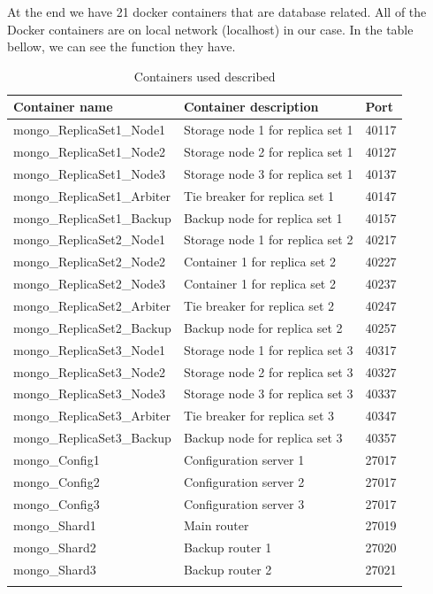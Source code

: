 At the end we have 21 docker containers that are database related. All of the Docker containers are on local network (localhost) in our case. In the table bellow, we can see the function they have.

\begin{center}
\begin{longtable}{ |m{5.5cm}|m{6cm}|m{1.5cm}| } 
 \hline
    Container name & Container description & Port \\ 
 \hline
 \hline
    mongo{\_}ReplicaSet1{\_}Node1 & Storage node 1 for replica set 1 & 40117\\ 
 \hline
    mongo{\_}ReplicaSet1{\_}Node2 & Storage node 2 for replica set 1 & 40127\\ 
 \hline
    mongo{\_}ReplicaSet1{\_}Node3 & Storage node 3 for replica set 1 & 40137\\ 
 \hline
    mongo{\_}ReplicaSet1{\_}Arbiter & Tie breaker for replica set 1 & 40147\\ 
 \hline
    mongo{\_}ReplicaSet1{\_}Backup & Backup node for replica set 1 & 40157\\ 
 \hline
 \hline
    mongo{\_}ReplicaSet2{\_}Node1 & Storage node 1 for replica set 2 & 40217\\ 
 \hline
    mongo{\_}ReplicaSet2{\_}Node2 & Container 1 for replica set 2 & 40227\\ 
 \hline
    mongo{\_}ReplicaSet2{\_}Node3 & Container 1 for replica set 2 & 40237\\ 
 \hline
    mongo{\_}ReplicaSet2{\_}Arbiter & Tie breaker for replica set 2 & 40247\\ 
 \hline
    mongo{\_}ReplicaSet2{\_}Backup & Backup node for replica set 2 & 40257\\ 
 \hline
 \hline
    mongo{\_}ReplicaSet3{\_}Node1 & Storage node 1 for replica set 3 & 40317\\ 
 \hline
    mongo{\_}ReplicaSet3{\_}Node2 & Storage node 2 for replica set 3 & 40327\\ 
 \hline
    mongo{\_}ReplicaSet3{\_}Node3 & Storage node 3 for replica set 3 & 40337\\ 
 \hline
    mongo{\_}ReplicaSet3{\_}Arbiter & Tie breaker for replica set 3 & 40347\\ 
 \hline
    mongo{\_}ReplicaSet3{\_}Backup & Backup node for replica set 3 & 40357\\ 
 \hline
 \hline
    mongo{\_}Config1 & Configuration server 1 & 27017\\ 
 \hline
    mongo{\_}Config2 & Configuration server 2 & 27017\\ 
 \hline
    mongo{\_}Config3 & Configuration server 3 & 27017\\ 
 \hline
 \hline
    mongo{\_}Shard1 & Main router & 27019\\ 
 \hline
    mongo{\_}Shard2 & Backup router 1 & 27020\\ 
 \hline
    mongo{\_}Shard3 & Backup router 2 & 27021\\ 
 \hline
\caption{Containers used described}
\end{longtable}
\end{center}

